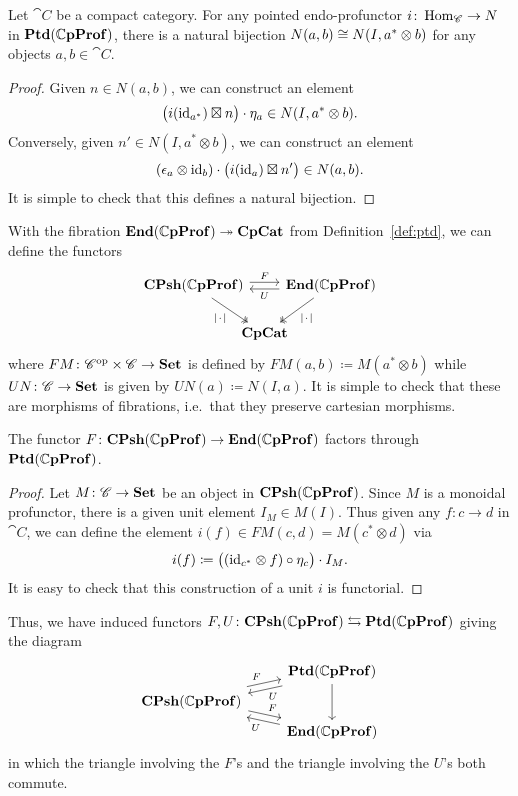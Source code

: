 \documentclass[11pt,oneside,article]{memoir}
\begin{document}
\begin{lemma}
    \label{Lem:comp prof bijection}
  Let $\cat{C}$ be a compact category. For any pointed endo-profunctor $i\colon\operatorname{Hom}_{\mathscr{C}}\to N$ in
  $\mathbf{Ptd}(\mathbb{C}\mathbf{pProf})$, there is a natural bijection $N(a,b)\cong N(I,a^*\otimes b)$ for any objects
  $a,b\in \cat{C}$.
\end{lemma}
\begin{proof}
  Given $n\in N(a,b)$, we can construct an element
  \[
    \big(i(\mathrm{id}_{a^*})\boxtimes n\big)\cdot\eta_a \in N(I,a^*\otimes b).
  \]
  Conversely, given $n'\in N(I,a^*\otimes b)$, we can construct an element
  \[
    (\epsilon_a\otimes\mathrm{id}_b)\cdot\big(i(\mathrm{id}_a)\boxtimes n'\big) \in N(a,b).
  \]
  It is simple to check that this defines a natural bijection.
\end{proof}

With the fibration $\mathbf{End}(\mathbb{C}\mathbf{pProf})\twoheadrightarrow\mathbf{CpCat}$ from Definition~\ref{def:ptd}, we can define the
functors
\begin{equation} \begin{tikzcd}[column sep=-1em]
    \label{eqn:functors_1C_CC}
  \CPsh(\dCompProf) \ar[rr,shift left,"F"] \ar[dr,two heads,"\MOb"']
    && \End(\dCompProf) \ar[ll,shift left,"U"] \ar[dl,two heads,"\MOb"] \\
  & \CompCat &
\end{tikzcd} \end{equation}
where $FM\colon{\mathscr{C}}^{\text{op}}\times \mathscr{C}\to\mathbf{Set}$ is defined by $FM(a,b)\coloneqq M(a^*\otimes b)$
while $UN\colon \mathscr{C}\to\mathbf{Set}$ is given by $UN(a)\coloneqq N(I,a)$. It is simple to check that
these are morphisms of fibrations, i.e.\ that they preserve cartesian morphisms.

\begin{proposition}
    \label{Prop:canonical unit}
  The functor $F\colon\mathbf{CPsh}(\mathbb{C}\mathbf{pProf})\to\mathbf{End}(\mathbb{C}\mathbf{pProf})$ factors through $\mathbf{Ptd}(\mathbb{C}\mathbf{pProf})$.
\end{proposition}
\begin{proof}
  Let $M\colon \mathscr{C}\to\mathbf{Set}$ be an object in $\mathbf{CPsh}(\mathbb{C}\mathbf{pProf})$. Since $M$ is a monoidal
  profunctor, there is a given unit element $I_M\in M(I)$. Thus given any $f\colon c\to d$ in $
  \cat{C}$, we can define the element $i(f)\in FM(c,d)=M(c^*\otimes d)$ via
  \[
    i(f)\coloneqq\big((\mathrm{id}_{c^*}\otimes f)\circ\eta_c\big)\cdot I_M.
  \]
  It is easy to check that this construction of a unit $i$ is functorial.
\end{proof}

Thus, we have induced functors $F,U\colon\mathbf{CPsh}(\mathbb{C}\mathbf{pProf})\leftrightarrows\mathbf{Ptd}(\mathbb{C}\mathbf{pProf})$ giving
the diagram
\begin{equation} \begin{tikzcd}[row sep=tiny]
    \label{eqn:ptd_functors_1C_CC}
  & \Ptd(\dCompProf) \ar[dd] \ar[dl,shift left,"U"] \\
  \CPsh(\dCompProf) \ar[ur,shift left,"F"] \ar[dr,shift left,"F"] & \\
  & \End(\dCompProf) \ar[ul,shift left,"U"]
\end{tikzcd} \end{equation}
in which the triangle involving the $F$'s and the triangle involving the $U$'s both commute.
\end{document}
